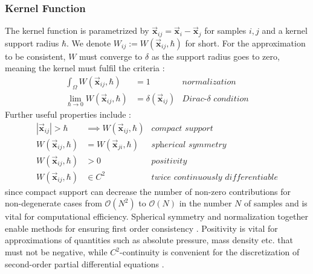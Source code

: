\documentclass[oneside, a4paper]{book}
\newcommand\abs[1]{\left|#1\right|}
\newcommand\vek[1]{\vec{\bm{#1}}}
\newcommand\br[1]{\left(#1\right)}
\begin{document}
    \subsubsection{Kernel Function}
    The kernel function is parametrized by $\vek{x}_{ij}=\vek{x}_i-\vek{x}_j$ for samples $i,j$ and a kernel support radius $\hbar$. We denote $W_{ij} := W(\vek{x}_{ij},\hbar) $ for short. For the approximation to be consistent, $W$ must converge to $\delta$ as the support radius goes to zero, meaning the kernel must fulfil the criteria \autocite{tutorial2019}:
    \begin{align}
      \int_\Omega W(\vek{x}_{ij},\hbar) &= 1 &\textit{normalization}\\
      \lim_{\hbar\rightarrow 0} W(\vek{x}_{ij},\hbar) &= \delta(\vek{x}_{ij}) &\textit{Dirac-$\delta$ condition}
    \end{align}
    Further useful properties include \autocite{tutorial2019}:
    \begin{align}
      \abs{\vek{x}_{ij}}>\hbar &\implies W(\vek{x}_{ij},\hbar) &\textit{compact support}\\
      W(\vek{x}_{ij},\hbar) &= W(\vek{x}_{ji}, \hbar) &\textit{spherical symmetry}\label{eq:sph-property-symmetry}\\
      W(\vek{x}_{ij},\hbar) &> 0 &\textit{positivity}\\
       W(\vek{x}_{ij},\hbar) &\in C^2 &\textit{twice continuously differentiable}\label{eq:sph-property-differentiable}
    \end{align}
    since compact support can decrease the number of non-zero contributions for non-degenerate cases from $\mathcal{O}\br{N^2}$ to $\mathcal{O}\br{N}$ in the number $N$ of samples and is vital for computational efficiency. Spherical symmetry and normalization together enable methods for ensuring first order consistency \autocite{tutorial2019}. Positivity is vital for approximations of quantities such as absolute pressure, mass density etc. that must not be negative, while $C^2$-continuity is convenient for the discretization of second-order partial differential equations \autocite{tutorial2019}.\\
\end{document}
